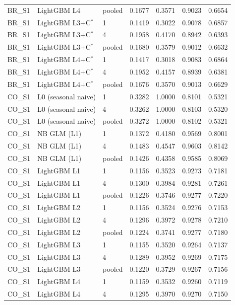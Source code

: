 \begin{tabular}{lllrrrr}
BR\_S1 & LightGBM L4 & pooled & 0.1677 & 0.3571 & 0.9023 & 0.6654 \\
BR\_S1 & LightGBM L3+C$^{*}$ & 1 & 0.1419 & 0.3022 & 0.9078 & 0.6857 \\
BR\_S1 & LightGBM L3+C$^{*}$ & 4 & 0.1958 & 0.4170 & 0.8942 & 0.6393 \\
BR\_S1 & LightGBM L3+C$^{*}$ & pooled & 0.1680 & 0.3579 & 0.9012 & 0.6632 \\
BR\_S1 & LightGBM L4+C$^{*}$ & 1 & 0.1417 & 0.3018 & 0.9083 & 0.6864 \\
BR\_S1 & LightGBM L4+C$^{*}$ & 4 & 0.1952 & 0.4157 & 0.8939 & 0.6381 \\
BR\_S1 & LightGBM L4+C$^{*}$ & pooled & 0.1676 & 0.3570 & 0.9013 & 0.6629 \\
CO\_S1 & L0 (seasonal naive) & 1 & 0.3282 & 1.0000 & 0.8101 & 0.5321 \\
CO\_S1 & L0 (seasonal naive) & 4 & 0.3262 & 1.0000 & 0.8103 & 0.5320 \\
CO\_S1 & L0 (seasonal naive) & pooled & 0.3272 & 1.0000 & 0.8102 & 0.5321 \\
CO\_S1 & NB GLM (L1) & 1 & 0.1372 & 0.4180 & 0.9569 & 0.8001 \\
CO\_S1 & NB GLM (L1) & 4 & 0.1483 & 0.4547 & 0.9603 & 0.8142 \\
CO\_S1 & NB GLM (L1) & pooled & 0.1426 & 0.4358 & 0.9585 & 0.8069 \\
CO\_S1 & LightGBM L1 & 1 & 0.1156 & 0.3523 & 0.9273 & 0.7181 \\
CO\_S1 & LightGBM L1 & 4 & 0.1300 & 0.3984 & 0.9281 & 0.7261 \\
CO\_S1 & LightGBM L1 & pooled & 0.1226 & 0.3746 & 0.9277 & 0.7220 \\
CO\_S1 & LightGBM L2 & 1 & 0.1156 & 0.3524 & 0.9276 & 0.7153 \\
CO\_S1 & LightGBM L2 & 4 & 0.1296 & 0.3972 & 0.9278 & 0.7210 \\
CO\_S1 & LightGBM L2 & pooled & 0.1224 & 0.3741 & 0.9277 & 0.7180 \\
CO\_S1 & LightGBM L3 & 1 & 0.1155 & 0.3520 & 0.9264 & 0.7137 \\
CO\_S1 & LightGBM L3 & 4 & 0.1289 & 0.3952 & 0.9269 & 0.7175 \\
CO\_S1 & LightGBM L3 & pooled & 0.1220 & 0.3729 & 0.9267 & 0.7156 \\
CO\_S1 & LightGBM L4 & 1 & 0.1159 & 0.3532 & 0.9260 & 0.7119 \\
CO\_S1 & LightGBM L4 & 4 & 0.1295 & 0.3970 & 0.9270 & 0.7150 \\

\end{tabular}
